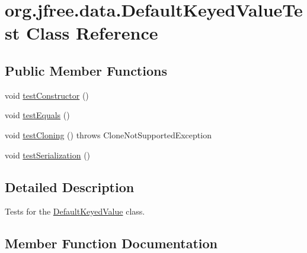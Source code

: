 \hypertarget{classorg_1_1jfree_1_1data_1_1_default_keyed_value_test}{}\section{org.\+jfree.\+data.\+Default\+Keyed\+Value\+Test Class Reference}
\label{classorg_1_1jfree_1_1data_1_1_default_keyed_value_test}
\subsection*{Public Member Functions}
\begin{DoxyCompactItemize}
\item 
void \mbox{\hyperlink{classorg_1_1jfree_1_1data_1_1_default_keyed_value_test_a0580b5175bcebe26d6d5ce2e4db4e30d}{test\+Constructor}} ()
\item 
void \mbox{\hyperlink{classorg_1_1jfree_1_1data_1_1_default_keyed_value_test_a64ca797f9b54c607e79c146b410257a2}{test\+Equals}} ()
\item 
void \mbox{\hyperlink{classorg_1_1jfree_1_1data_1_1_default_keyed_value_test_aed8d1f9cf5c49eed5dd8c46a918f1e8c}{test\+Cloning}} ()  throws Clone\+Not\+Supported\+Exception 
\item 
void \mbox{\hyperlink{classorg_1_1jfree_1_1data_1_1_default_keyed_value_test_a4875655f57cd7f96222ca2f6d03873ea}{test\+Serialization}} ()
\end{DoxyCompactItemize}


\subsection{Detailed Description}
Tests for the \mbox{\hyperlink{classorg_1_1jfree_1_1data_1_1_default_keyed_value}{Default\+Keyed\+Value}} class. 

\subsection{Member Function Documentation}
\mbox{\label{classorg_1_1jfree_1_1data_1_1_default_keyed_value_test_aed8d1f9cf5c49eed5dd8c46a918f1e8c}} 
